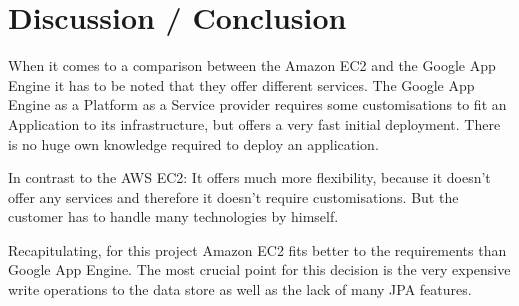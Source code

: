 \section{Discussion / Conclusion}

When it comes to a comparison between the Amazon EC2 and the Google App Engine it has to be noted that they offer different services. The Google App Engine as a Platform as a Service provider requires some customisations to fit an Application to its infrastructure, but offers a very fast initial deployment. There is no huge own knowledge required to deploy an application.

In contrast to the AWS EC2: It offers much more flexibility, because it doesn't offer any services and therefore it doesn't require customisations. But the customer has to handle many technologies by himself.

Recapitulating, for this project Amazon EC2 fits better to the requirements than Google App Engine. The most crucial point for this decision is the very expensive write operations to the data store as well as the lack of many JPA features.




